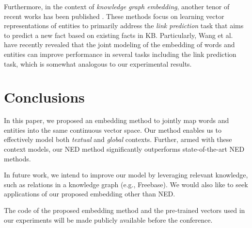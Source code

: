 \documentclass[11pt,letterpaper]{article}
\begin{document}

Furthermore, in the context of \textit{knowledge graph embedding}, another tenor of recent works has been published \cite{AAAI113659,NIPS2013_5028,AAAI159571}.
These methods focus on learning vector representations of entities to primarily address the \textit{link prediction} task that aims to predict a new fact based on existing facts in KB.
Particularly, Wang et al. \cite{wang-EtAl:2014:EMNLP20145} have recently revealed that the joint modeling of the embedding of words and entities can improve performance in several tasks including the link prediction task, which is somewhat analogous to our experimental results.

\section{Conclusions}

In this paper, we proposed an embedding method to jointly map words and entities into the same continuous vector space.
Our method enables us to effectively model both \textit{textual} and \textit{global} contexts.
Further, armed with these context models, our NED method significantly outperforms state-of-the-art NED methods.

In future work, we intend to improve our model by leveraging relevant knowledge, such as relations in a knowledge graph (e.g., Freebase).
We would also like to seek applications of our proposed embedding other than NED.

The code of the proposed embedding method and the pre-trained vectors used in our experiments will be made publicly available before the conference.



%
\end{document}
